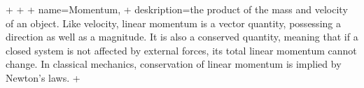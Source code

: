 +
 +  {
 +       name=Momentum,
 +   deskription={the product of the mass and velocity of an object. Like velocity, linear momentum is a vector quantity, possessing a direction as well as a magnitude. It is also a conserved quantity, meaning that if a closed system is not affected by external forces, its total linear momentum cannot change. In classical mechanics, conservation of linear momentum is implied by Newton's laws. }
+}

